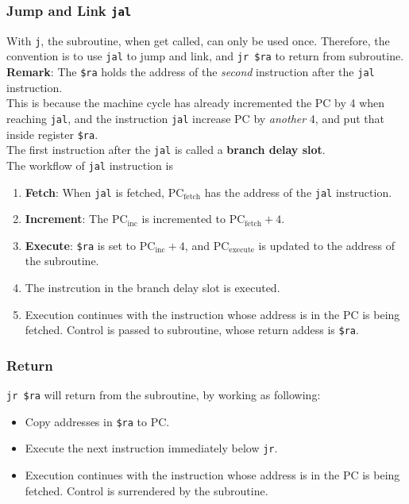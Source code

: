 \documentclass[12pt]{article}
\theoremstyle{definition}
\begin{document}
\subsubsection{Jump and Link \texttt{jal}}
With \texttt{j}, the subroutine, when get called, can only be used once. Therefore, the convention is to use \texttt{jal} to jump and link, and \texttt{jr \$ra} to return from subroutine.\\
\textbf{Remark}: The \texttt{\$ra} holds the address of the \textit{second} instruction after the \texttt{jal} instruction.\\This is because the machine cycle has already incremented the PC by 4 when reaching \texttt{jal}, and the instruction \texttt{jal} increase PC by \textit{another} 4, and put that inside register \texttt{\$ra}.\\
The first instruction after the \texttt{jal} is called a \textbf{branch delay slot}.\\
The workflow of \texttt{jal} instruction is
\begin{enumerate}
  \item \textbf{Fetch}: When \texttt{jal} is fetched, $\text{PC}_\text{fetch}$ has the address of the \texttt{jal} instruction.
  \item \textbf{Increment}: The $\text{PC}_\text{inc}$ is incremented to $\text{PC}_\text{fetch}+4$.
  \item \textbf{Execute}: \texttt{\$ra} is set to $\text{PC}_\text{inc}+4$, and $\text{PC}_\text{execute}$ is updated to the address of the subroutine.
  \item The instrcution in the branch delay slot is executed.
  \item Execution continues with the instruction whose address is in the PC is being fetched. Control is passed to subroutine, whose return addess is \texttt{\$ra}.
\end{enumerate} 
\subsubsection{Return}
\texttt{jr \$ra} will return from the subroutine, by working as following:
\begin{itemize}
  \item Copy addresses in \texttt{\$ra} to PC.
  \item Execute the next instruction immediately below \texttt{jr}.
  \item Execution continues with the instruction whose address is in the PC is being fetched. Control is surrendered by the subroutine.
\end{itemize}
\end{document}
